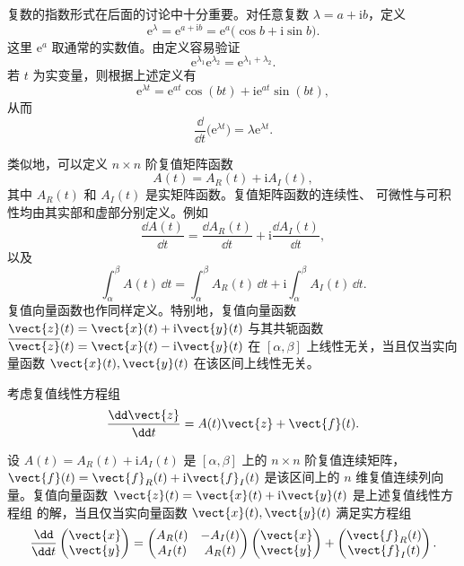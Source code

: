 复数的指数形式在后面的讨论中十分重要。对任意复数
$\lambda=a+\mathrm{i}b$，定义
\[
	\mathrm{e}^{\lambda}
	=\mathrm{e}^{a+\mathrm{i}b}
	=\mathrm{e}^{a}\bigl(\cos b+\mathrm{i}\sin b\bigr).
\]
这里 $\mathrm{e}^{a}$ 取通常的实数值。由定义容易验证
\[
	\mathrm{e}^{\lambda_1}\mathrm{e}^{\lambda_2}
	=\mathrm{e}^{\lambda_1+\lambda_2}.
\]
若 $t$ 为实变量，则根据上述定义有
\[
	\mathrm{e}^{\lambda t}
	=\mathrm{e}^{at}\cos(bt)
	+\mathrm{i}\mathrm{e}^{at}\sin(bt),
\]
从而
\[
	\dfrac{\dd}{\dd t}\bigl(\mathrm{e}^{\lambda t}\bigr)
	=\lambda\mathrm{e}^{\lambda t}.
\]

类似地，可以定义 $n\times n$ 阶复值矩阵函数
\[
	A(t)=A_R(t)+\mathrm{i}A_I(t),
\]
其中 $A_R(t)$ 和 $A_I(t)$ 是实矩阵函数。复值矩阵函数的连续性、
可微性与可积性均由其实部和虚部分别定义。例如
\[
	\dfrac{\dd A(t)}{\dd t}
	=\dfrac{\dd A_R(t)}{\dd t}
	+\mathrm{i}\dfrac{\dd A_I(t)}{\dd t},
\]
以及
\[
	\int_{\alpha}^{\beta}A(t)\,\dd t
	=\int_{\alpha}^{\beta}A_R(t)\,\dd t
	+\mathrm{i}\int_{\alpha}^{\beta}A_I(t)\,\dd t.
\]
复值向量函数也作同样定义。特别地，复值向量函数
$\vect{z}(t)=\vect{x}(t)+\mathrm{i}\vect{y}(t)$ 与其共轭函数
$\overline{\vect{z}}(t)=\vect{x}(t)-\mathrm{i}\vect{y}(t)$ 在
$[\alpha,\beta]$ 上线性无关，当且仅当实向量函数
$\vect{x}(t),\vect{y}(t)$ 在该区间上线性无关。

考虑复值线性方程组
\[
	\dfrac{\dd\vect{z}}{\dd t}
	=A(t)\vect{z}+\vect{f}(t).
\]

\begin{proposition}\label{thm:复值线性方程组的实化}
	设 $A(t)=A_R(t)+\mathrm{i}A_I(t)$ 是 $[\alpha,\beta]$ 上的
	$n\times n$ 阶复值连续矩阵，
	$\vect{f}(t)=\vect{f}_R(t)+\mathrm{i}\vect{f}_I(t)$ 是该区间上的
	$n$ 维复值连续列向量。复值向量函数
	$\vect{z}(t)=\vect{x}(t)+\mathrm{i}\vect{y}(t)$ 是上述复值线性方程组
	的解，当且仅当实向量函数
	$\vect{x}(t),\vect{y}(t)$ 满足实方程组
	\[
		\dfrac{\dd}{\dd t}
		\begin{pmatrix}
			\vect{x}\\
			\vect{y}
		\end{pmatrix}
		=
		\begin{pmatrix}
			A_R(t) & -A_I(t)\\
			A_I(t) & A_R(t)
		\end{pmatrix}
		\begin{pmatrix}
			\vect{x}\\
			\vect{y}
		\end{pmatrix}
		+
		\begin{pmatrix}
			\vect{f}_R(t)\\
			\vect{f}_I(t)
		\end{pmatrix}.
	\]
\end{proposition}

